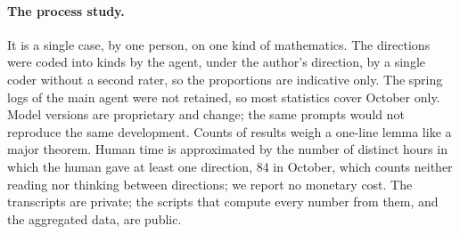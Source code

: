 \paragraph{The process study.} It is a single case, by one person, on one kind of mathematics. The
directions were coded into kinds by the agent, under the author's direction, by a single coder without a
second rater, so the proportions are indicative only. The spring logs of the main agent were not
retained, so most statistics cover October only. Model versions are proprietary and change; the same
prompts would not reproduce the same development. Counts of results weigh a one-line lemma like a major
theorem. Human time is approximated by the number of distinct hours in which the human gave at least one
direction, 84 in October, which counts neither reading nor thinking between directions; we report no
monetary cost. The transcripts are private; the scripts that compute every number from them, and the
aggregated data, are public.

